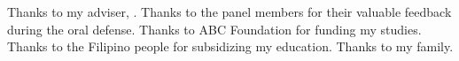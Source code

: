
Thanks to my adviser, \Adviser. Thanks to the panel members for their valuable feedback during the oral defense. Thanks to ABC Foundation for funding my studies. Thanks to the Filipino people for subsidizing my education. Thanks to my family.
